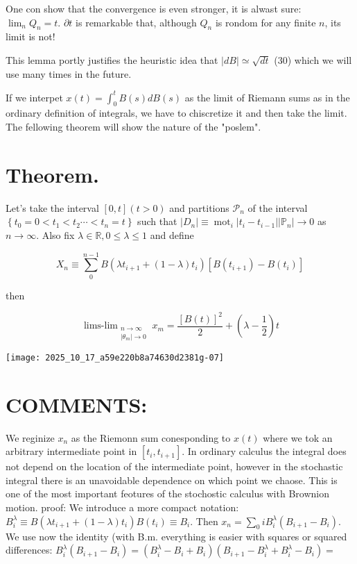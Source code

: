 One con show that the convergence is even stronger, it is alwast sure: $\lim _{n} Q_{n}=t$. $\partial t$ is remarkable that, although $Q_{n}$ is rondom for any finite $n$, its limit is not!

This lemma portly justifies the heuristic idea that $|d B| \simeq \sqrt{d t}$
(30) which we will use many times in the future.

If we interpet $x(t)=\int_{0}^{t} B(s) d B(s)$ as the limit of Riemann sums as in the ordinary definition of integrals, we have to chiscretize it and then take the limit. The fellowing theorem will show the nature of the "poslem".

\section*{Theorem.}
Let's take the interval $[0, t](t>0)$ and partitions $\mathcal{P}_{n}$ of the interval $\left\{t_{0}=0<t_{1}<t_{2} \cdots<t_{n}=t\right\}$ such that $\left|D_{n}\right| \equiv \operatorname{mot}_{i}\left|t_{i}-t_{i-1}\right| \left|\mathbb{P}_{n}\right| \rightarrow 0$ as $n \rightarrow \infty$. Also fix $\lambda \in \mathbb{R}, 0 \leq \lambda \leq 1$ and define

$$
 X_{n} \equiv \sum_{0}^{n-1} B\left(\lambda t_{i+1}+(1-\lambda) t_{i}\right)\left[B\left(t_{i+1}\right)-B\left(t_{i}\right)\right]
$$ 

then

\begin{equation*}
\operatorname{lims-lim}_{\substack{n \rightarrow \infty \\\left|\theta_{m}\right| \rightarrow 0}} x_{m}=\frac{[B(t)]^{2}}{2}+\left(\lambda-\frac{1}{2}\right) t \tag{31}
\end{equation*}


\begin{center}
\texttt{[image: 2025\_10\_17\_a59e220b8a74630d2381g-07]}
\end{center}

\section*{COMMENTS:}
We reginize $x_{n}$ as the Riemonn sum conesponding to $x(t)$ where we tok an arbitrary intermediate point in $\left[t_{i}, t_{i+1}\right]$. In ordinary calculus the integral does not depend on the location of the intermediate point, however in the stochastic integral there is an unavoidable dependence on which point we chaose. This is one of the most important feotures of the stochostic calculus with Brownion motion.
proof:
We introduce a more compact notation: $B_{i}^{\lambda} \equiv B\left(\lambda t_{i+1}+(1-\lambda) t_{i}\right) B
\left(t_{i}\right) \equiv B_{i}$. Then $x_{n}=\sum_{0} i B_{i}^{\lambda}\left(B_{i+1}-B_{i}\right)$.
We use now the identity (with B.m. everything is easier with squares or squared differences:
$B_{i}^{\lambda}\left(B_{i+1}-B_{i}\right)=\left(B_{i}^{\lambda}-B_{i}+B_{i}\right)\left(B_{i+1}-B_{i}^{\lambda}+B_{i}^{\lambda}-B_{i}\right)=$

